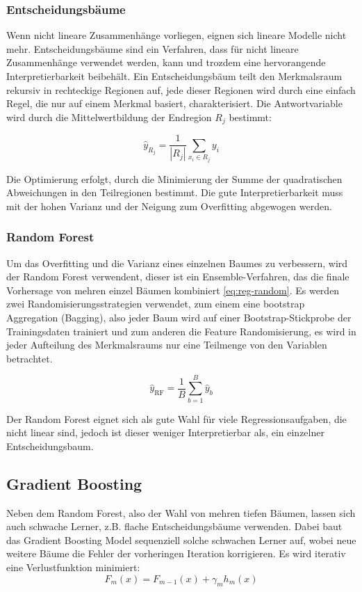 \subsubsection{Entscheidungsbäume}

Wenn nicht lineare Zusammenhänge vorliegen, eignen sich lineare Modelle nicht mehr. Entscheidungsbäume sind ein Verfahren, dass für nicht lineare Zusammenhänge verwendet werden, kann und trozdem eine hervorangende Interpretierbarkeit beibehält. Ein Entscheidungsbäum teilt den Merkmalsraum rekursiv in rechteckige Regionen auf, jede dieser Regionen wird durch eine einfach Regel, die nur auf einem Merkmal basiert, charakterisiert. Die Antwortvariable wird durch die Mittelwertbildung der Endregion \(R_j\) bestimmt:

\begin{equation}
\hat{y}_{R_j} = \frac{1}{|R_j|} \sum_{x_i \in R_j} y_i
\label{eq:reg-tree}
\end{equation}

Die Optimierung erfolgt, durch die Minimierung der Summe der quadratischen Abweichungen in den Teilregionen bestimmt. Die gute Interpretierbarkeit muss mit der hohen Varianz und der Neigung zum Overfitting abgewogen werden. \cite{Hastie2009}

\subsubsection{Random Forest}
Um das Overfitting und die Varianz eines einzelnen Baumes zu verbessern, wird der Random Forest verwendent, dieser ist ein Ensemble-Verfahren, das die finale Vorhersage von mehren einzel Bäumen kombiniert \ref{eq:reg-random}. Es werden zwei Randomisierungsstrategien verwendet, zum einem eine bootstrap Aggregation (Bagging), also jeder Baum wird auf einer Bootstrap-Stickprobe der Trainingsdaten trainiert und zum anderen die Feature Randomisierung, es wird in jeder Aufteilung des Merkmalsraums nur eine Teilmenge von den Variablen betrachtet. 

\begin{equation}
  \hat{y}_{\text{RF}} = \frac{1}{B} \sum_{b=1}^{B} \hat{y}_b
  \label{eq:reg-random}
\end{equation}

Der Random Forest eignet sich als gute Wahl für viele Regressionsaufgaben, die nicht linear sind, jedoch ist dieser weniger Interpretierbar als, ein einzelner Entscheidungsbaum. \cite{Hastie2009}

\subsection{Gradient Boosting}
Neben dem Random Forest, also der Wahl von mehren tiefen Bäumen, lassen sich auch schwache Lerner, z.B. flache Entscheidungsbäume verwenden. Dabei baut das Gradient Boosting Model sequenziell solche schwachen Lerner auf, wobei neue weitere Bäume die Fehler der vorheringen Iteration korrigieren. Es wird iterativ eine Verlustfunktion minimiert:
\begin{equation}
  F_m(x) = F_{m-1}(x) + \gamma_m h_m(x)
  \label{eq:reg-grad}
\end{equation}

